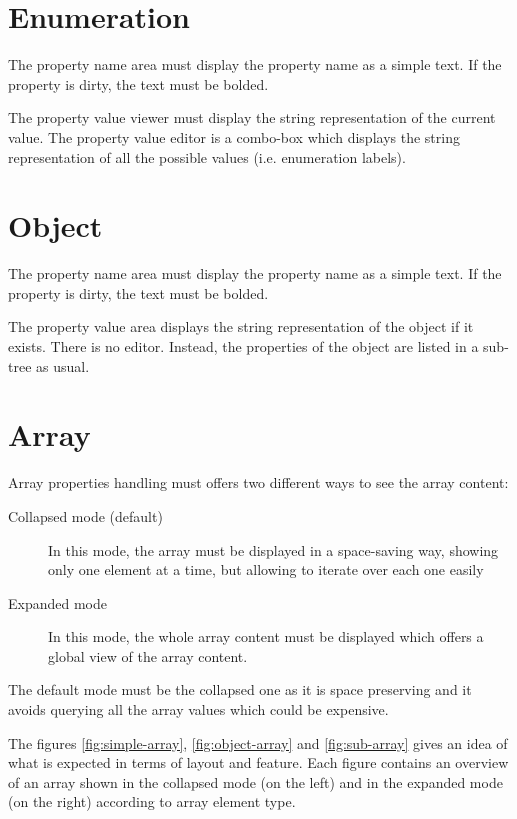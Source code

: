\documentclass[a4paper, twoside]{report}
\begin{document}
\section{Enumeration}

The property name area must display the property name as a simple text. If the property is dirty,
the text must be bolded.

The property value viewer must display the string representation of the current value.
The property value editor is a combo-box which displays the string representation of all the
possible values (i.e. enumeration labels).

\section{Object}

The property name area must display the property name as a simple text. If the property is dirty,
the text must be bolded.

The property value area displays the string representation of the object if it exists.
There is no editor. Instead, the properties of the object are listed in a sub-tree as usual.

\section{Array}

Array properties handling must offers two different ways to see the array content:
\begin{description}
    \item[Collapsed mode (default)] In this mode, the array must be displayed in a space-saving way,
showing only one element at a time, but allowing to iterate over each one easily
    \item[Expanded mode] In this mode, the whole array content must be displayed which offers a
global view of the array content.
\end{description}

The default mode must be the collapsed one as it is space preserving and it avoids querying all the
array values which could be expensive.

The figures \ref{fig:simple-array}, \ref{fig:object-array} and \ref{fig:sub-array} gives an idea of
what is expected in terms of layout and feature. Each figure contains an overview of an array shown
in the collapsed mode (on the left) and in the expanded mode (on the right) according to array
element type.
\end{document}
